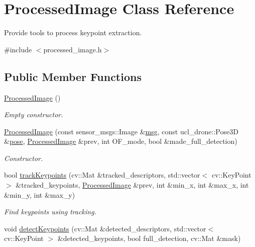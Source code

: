 \hypertarget{classProcessedImage}{}\section{Processed\+Image Class Reference}
\label{classProcessedImage}


Provide tools to process keypoint extraction.  




{\ttfamily \#include $<$processed\+\_\+image.\+h$>$}

\subsection*{Public Member Functions}
\begin{DoxyCompactItemize}
\item 
\mbox{\label{classProcessedImage_ae69fda8dc14b796b7fb632d596b69590}} 
\hyperlink{classProcessedImage_ae69fda8dc14b796b7fb632d596b69590}{Processed\+Image} ()
\begin{DoxyCompactList}\small\item\em Empty constructor. \end{DoxyCompactList}\item 
\hyperlink{classProcessedImage_a4733c93afcd9d3376cb5b1e02dbf6024}{Processed\+Image} (const sensor\+\_\+msgs\+::\+Image \&\hyperlink{classProcessedImage_a8e3f0066b0fd5f1b858f0d977d8cb8ff}{msg}, const ucl\+\_\+drone\+::\+Pose3D \&\hyperlink{classProcessedImage_a2297493e85206abec15dc01ad467142f}{pose}, \hyperlink{classProcessedImage}{Processed\+Image} \&prev, int O\+F\+\_\+mode, bool \&made\+\_\+full\+\_\+detection)
\begin{DoxyCompactList}\small\item\em Constructor. \end{DoxyCompactList}\item 
bool \hyperlink{classProcessedImage_a267f990b3804d93170e0abae9423cb3f}{track\+Keypoints} (cv\+::\+Mat \&tracked\+\_\+descriptors, std\+::vector$<$ cv\+::\+Key\+Point $>$ \&tracked\+\_\+keypoints, \hyperlink{classProcessedImage}{Processed\+Image} \&prev, int \&min\+\_\+x, int \&max\+\_\+x, int \&min\+\_\+y, int \&max\+\_\+y)
\begin{DoxyCompactList}\small\item\em Find keypoints using tracking. \end{DoxyCompactList}\item 
void \hyperlink{classProcessedImage_a54e2bf4e40ce4ac52bd83b33afe40b4b}{detect\+Keypoints} (cv\+::\+Mat \&detected\+\_\+descriptors, std\+::vector$<$ cv\+::\+Key\+Point $>$ \&detected\+\_\+keypoints, bool full\+\_\+detection, cv\+::\+Mat \&mask)

\end{DoxyCompactItemize}
